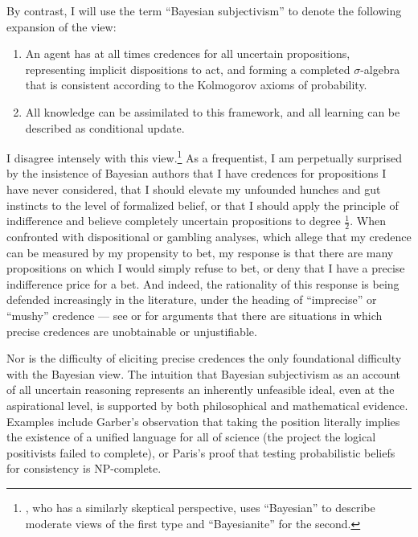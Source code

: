 \documentclass[letterpaper,12pt]{article}
\begin{document}
By contrast, I will use the term ``Bayesian subjectivism'' to denote the following expansion of the view:

\begin{enumerate}
\item
An agent has at all times credences for all uncertain propositions, representing implicit dispositions to act, and forming a completed $\sigma$-algebra that is consistent according to the Kolmogorov axioms of probability.
\item
All knowledge can be assimilated to this framework, and all learning can be described as conditional update.
\end{enumerate}

I disagree intensely with this view.\footnote{\cite{BinmoreManuscript-BINMDI}, who has a similarly skeptical perspective, uses ``Bayesian'' to describe moderate views of the first type and ``Bayesianite'' for the second.} As a frequentist, I am perpetually surprised by the insistence of Bayesian authors that I have credences for propositions I have never considered, that I should elevate my unfounded hunches and gut instincts to the level of formalized belief, or that I should apply the principle of indifference and believe completely uncertain propositions to degree $\frac{1}{2}$. When confronted with dispositional or gambling analyses, which allege that my credence can be measured by my propensity to bet, my response is that there are many propositions on which I would simply refuse to bet, or deny that I have a precise indifference price for a bet. And indeed, the rationality of this response is being defended increasingly in the literature, under the heading of ``imprecise'' or ``mushy'' credence --- see \cite{elga2010subjective} or \cite{Joyce2010-JOYADO-2} for arguments that there are situations in which precise credences are unobtainable or unjustifiable.

Nor is the difficulty of eliciting precise credences the only foundational difficulty with the Bayesian view. The intuition that Bayesian subjectivism as an account of all uncertain reasoning represents an inherently unfeasible ideal, even at the aspirational level, is supported by both philosophical and mathematical evidence. Examples include Garber's observation \citeyearpar{garber1983} that taking the position literally implies the existence of a unified language for all of science (the project the logical positivists failed to complete), or Paris's proof \citeyearpar{paris1994uncertain} that testing probabilistic beliefs for consistency is NP-complete.
\end{document}
